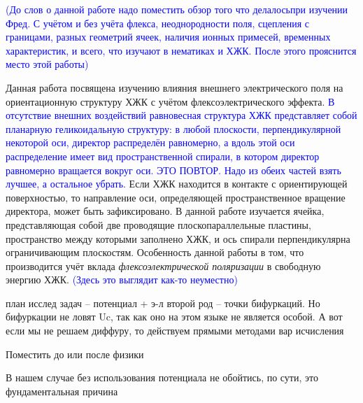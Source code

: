 \textcolor{blue}{(До слов о данной работе надо поместить обзор того что делалосьпри изучении Фред.  С учётом и без учёта флекса, неоднородности поля, сцепления с границами, разных геометрий ячеек, наличия ионных примесей, временных характеристик, и всего, что изучают в нематиках и ХЖК. После этого прояснится место этой работы)}

Данная работа посвящена изучению влияния внешнего электрического поля на ориентационную структуру ХЖК с учётом флексоэлектрического эффекта.
\textcolor{blue}{В отсутствие внешних воздействий равновесная структура ХЖК представляет собой планарную геликоидальную структуру: в любой плоскости, перпендикулярной некоторой оси, директор распределён равномерно, а вдоль этой оси распределение имеет вид пространственной спирали, в котором директор равномерно вращается вокруг оси. ЭТО ПОВТОР. Надо из обеих частей взять лучшее, а остальное убрать.}
Если ХЖК находится в контакте с ориентирующей поверхностью, то направление оси, определяющей пространственное вращение директора, может быть зафиксировано.
В данной работе изучается ячейка, представляющая собой две проводящие плоскопараллельные пластины, пространство между которыми заполнено ХЖК, и ось спирали перпендикулярна ограничивающим плоскостям.
Особенность данной работы в том, что производится учёт вклада \textit{флексоэлектрической поляризации} в свободную энергию ХЖК. \textcolor{blue}{(Здесь это выглядит как-то неуместно)}

	
	план исслед задач -- потенциал + э-л
	второй род -- точки бифуркаций.
	Но бифуркации не ловят Uc, так как оно на этом языке не является особой.
	А вот если мы не решаем диффуру, то действуем прямыми методами вар исчисления
	
	Поместить до или после физики
	
	В нашем случае без использования потенциала не обойтись, по сути, это фундаментальная причина
	

